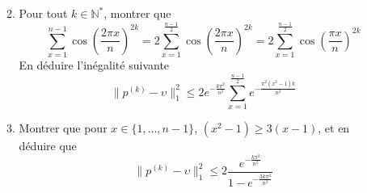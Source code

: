 \documentclass{article}[a4paper]
\newcommand{\N}{\mathbb{N}}
\newcommand{\norm}[1]{\lVert#1\rVert}
\begin{document}
\begin{enumerate}
\begin{enumerate}
\begin{equation*}
        \end{equation*}
        \item Pour tout \(k\in \N^*\), montrer que 
        \begin{equation*}
            \sum_{x=1}^{n-1}\cos\left(\frac{2\pi x}{n}\right)^{2k} = 2\sum_{x=1}^{\frac{n-1}{2}}\cos\left(\frac{2\pi x}{n}\right)^{2k} = 2\sum_{x=1}^{\frac{n-1}{2}}\cos\left(\frac{\pi x}{n}\right)^{2k}
        \end{equation*}
        En déduire l'inégalité suivante
        \begin{equation*}
        \norm{p^{(k)}-\upsilon}_1^2 \le 2e^{-\frac{k\pi^2}{n^2}}\sum_{x=1}^{\frac{n-1}{2}}e^{-\frac{\pi^2(x^2-1)k}{n^2}}
        \end{equation*}
        \item Montrer que pour \(x\in\{1,\dots,n-1\}\), \((x^2-1)\ge 3(x-1)\), et en déduire que 
        \begin{equation*}
            \norm{p^{(k)}-\upsilon}_1^2 \le 2\frac{e^{-\frac{k\pi^2}{n^2}}}{1- e^{-\frac{3k\pi^2}{n^2}}}
        \end{equation*}
    \end{enumerate}

\end{enumerate}
\end{document}
